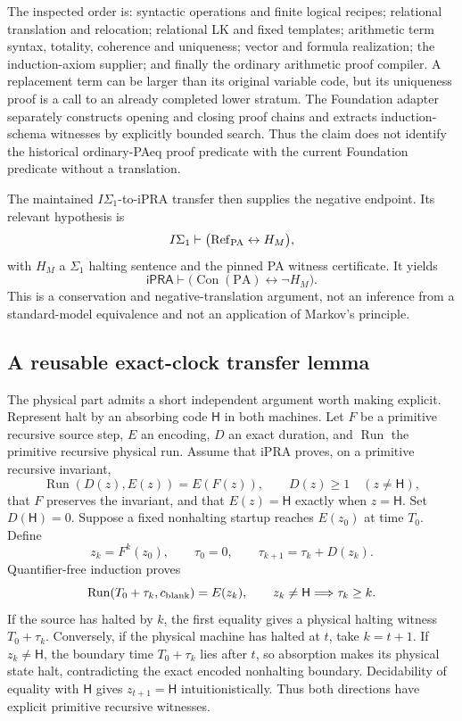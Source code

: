 The inspected order is: syntactic operations and finite logical recipes;
relational translation and relocation; relational LK and fixed templates;
arithmetic term syntax, totality, coherence and uniqueness; vector and
formula realization; the induction-axiom supplier; and finally the
ordinary arithmetic proof compiler. A replacement term can be larger than
its original variable code, but its uniqueness proof is a call to an
already completed lower stratum. The Foundation adapter separately
constructs opening and closing proof chains and extracts induction-schema
witnesses by explicitly bounded search. Thus the claim does not identify
the historical ordinary-PAeq proof predicate with the current Foundation
predicate without a translation.

The maintained $I\Sigma_1$-to-iPRA transfer then supplies the negative
endpoint. Its relevant hypothesis is
\[
 I\Sigma_1\vdash\bigl(\operatorname{Ref}_{\rm PA}
                  \leftrightarrow H_M\bigr),
\]
with $H_M$ a $\Sigma_1$ halting sentence and the pinned PA witness
certificate. It yields
\[
 \mathsf{iPRA}\vdash
   \bigl(\operatorname{Con}(\mathrm{PA})\leftrightarrow\neg H_M\bigr).
\]
This is a conservation and negative-translation argument, not an inference
from a standard-model equivalence and not an application of Markov's
principle.

\subsection{A reusable exact-clock transfer lemma}

The physical part admits a short independent argument worth making
explicit. Represent halt by an absorbing code $\mathsf H$ in both
machines. Let $F$ be a primitive recursive source step, $E$ an encoding,
$D$ an exact duration, and $\operatorname{Run}$ the primitive recursive
physical run. Assume that iPRA proves, on a primitive recursive invariant,
\[
 \operatorname{Run}(D(z),E(z))=E(F(z)),\qquad
 D(z)\ge1\quad(z\ne\mathsf H),
\]
that $F$ preserves the invariant, and that $E(z)=\mathsf H$ exactly when
$z=\mathsf H$. Set $D(\mathsf H)=0$. Suppose a fixed nonhalting startup
reaches $E(z_0)$ at time $T_0$.
Define
\[
 z_k=F^k(z_0),\qquad \tau_0=0,\qquad
 \tau_{k+1}=\tau_k+D(z_k).
\]
Quantifier-free induction proves
\[
 \operatorname{Run}(T_0+\tau_k,c_{\rm blank})=E(z_k),
 \qquad z_k\ne\mathsf H\Longrightarrow\tau_k\ge k.
\]
If the source has halted by $k$, the first equality gives a physical
halting witness $T_0+\tau_k$. Conversely, if the physical machine has
halted at $t$, take $k=t+1$. If $z_k\ne\mathsf H$, the boundary time
$T_0+\tau_k$ lies after $t$, so absorption makes its physical state halt,
contradicting the exact encoded nonhalting boundary. Decidability of
equality with $\mathsf H$ gives $z_{t+1}=\mathsf H$ intuitionistically.
Thus both directions have explicit primitive recursive witnesses.

